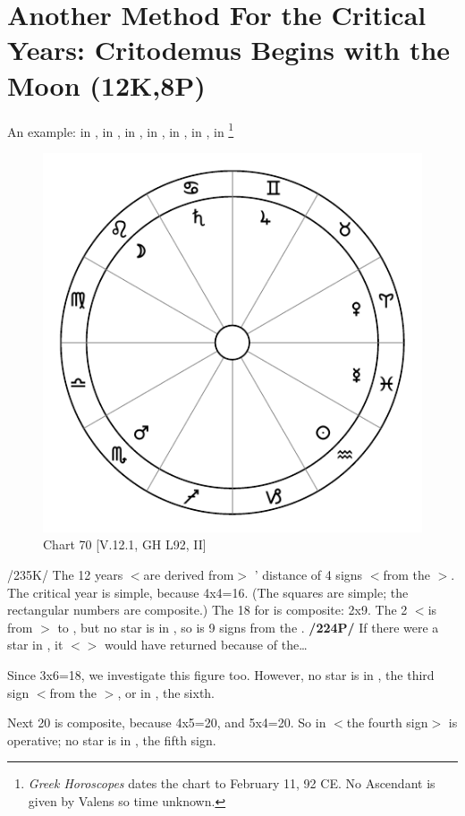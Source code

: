 \section{Another Method For the Critical Years: Critodemus Begins with the Moon (12K,8P)}

An example: \Sun\xspace in \Aquarius, \Moon\xspace in \Leo, \Saturn\xspace in \Cancer, \Jupiter\xspace in \Gemini, \Mars\xspace in \Scorpio, \Venus\xspace in \Aries, \Mercury\xspace in \Pisces\footnote{\textit{Greek Horoscopes} dates the chart to February 11, 92 CE. No Ascendant is given by Valens so time unknown.} 

\begin{figure}
\centering
\vspace{-20pt}
\includegraphics[width=.68\textwidth]{charts/5_12_1}
\caption{Chart 70 [V.12.1, GH L92, II]}
\label{fig:chart70}
\end{figure}

/235K/ The 12 years $<$are derived from$>$ \Mars’ distance of 4 signs
$<$from the \Moon$>$. The critical year is simple, because 4x4=16. (The squares are simple; the rectangular numbers are composite.) The 18 for \Venus\xspace is composite: 2x9. The 2 $<$is from \Leo$>$ to \Virgo, but no star is in \Virgo, so \Venus\xspace is 9 signs from the \Moon. \textbf{/224P/} If there were a star in \Virgo, it $<$\Venus$>$ would have returned because of the…

Since 3x6=18, we investigate this figure too. However, no star is in \Libra, the third sign $<$from the \Moon$>$, or in \Capricorn, the sixth.

Next 20 is composite, because 4x5=20, and 5x4=20. So \Mars\xspace in \Scorpio\xspace $<$the fourth sign$>$ is operative; no star is in \Sagittarius, the fifth sign.

